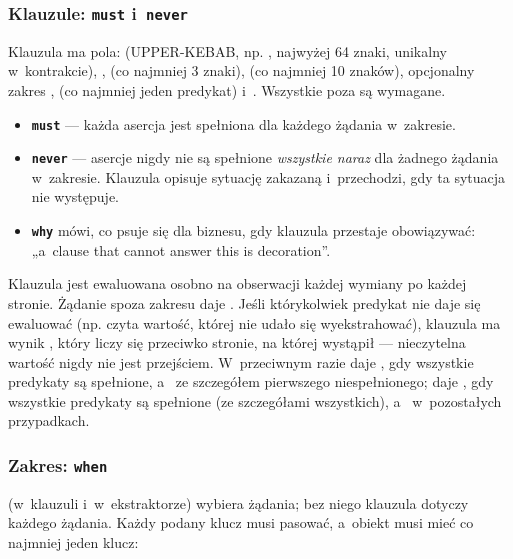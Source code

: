 \subsubsection{Klauzule: \texttt{must} i~\texttt{never}}

Klauzula ma pola:  (UPPER-KEBAB, np. , najwyżej 64
znaki, unikalny w~kontrakcie), ,  (co najmniej 3 znaki),
 (co najmniej 10 znaków), opcjonalny zakres , 
(co najmniej jeden predykat) i~. Wszystkie poza  są
wymagane.

\begin{itemize}
  \item \textbf{\texttt{must}} --- każda asercja jest spełniona dla każdego żądania w~zakresie.
  \item \textbf{\texttt{never}} --- asercje nigdy nie są spełnione \emph{wszystkie naraz} dla
        żadnego żądania w~zakresie. Klauzula  opisuje sytuację zakazaną i~przechodzi, gdy ta sytuacja nie występuje.
  \item \textbf{\texttt{why}} mówi, co psuje się dla biznesu, gdy klauzula przestaje
        obowiązywać: „a~clause that cannot answer this is decoration”.
\end{itemize}

Klauzula jest ewaluowana osobno na obserwacji każdej wymiany po każdej stronie. Żądanie spoza
zakresu daje . Jeśli którykolwiek predykat nie daje się ewaluować
(np. czyta wartość, której nie udało się wyekstrahować), klauzula ma wynik ,
który liczy się przeciwko stronie, na której wystąpił --- nieczytelna wartość nigdy nie jest
przejściem. W~przeciwnym razie  daje , gdy wszystkie predykaty
są spełnione, a~ ze szczegółem pierwszego niespełnionego; 
daje , gdy wszystkie predykaty są spełnione (ze szczegółami wszystkich), a~ w~pozostałych przypadkach.

\subsubsection{Zakres: \texttt{when}}

 (w~klauzuli i~w~ekstraktorze) wybiera żądania; bez niego klauzula dotyczy
każdego żądania. Każdy podany klucz musi pasować, a~obiekt musi mieć co najmniej jeden klucz:


